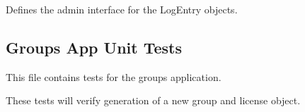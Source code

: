 \documentclass[letterpaper,10pt,english]{sphinxmanual}
\begin{document}

\begin{fulllineitems}
\label{groups:mousedb.groups.admin.LogEntryAdmin}
Defines the admin interface for the LogEntry objects.

\end{fulllineitems}



\subsection{Groups App Unit Tests}
\label{groups:module-mousedb.groups.tests}\label{groups:groups-app-unit-tests}
This file contains tests for the groups application.

These tests will verify generation of a new group and license object.
\end{document}
